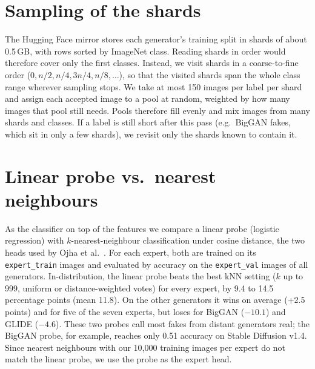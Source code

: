 \documentclass[10pt,a4paper]{article}
\begin{document}
\section{Sampling of the shards}\label{app:sampling}
The Hugging Face mirror stores each generator's training split in shards of about 0.5\,GB, with rows sorted by ImageNet class. Reading shards in order would therefore cover only the first classes. Instead, we visit shards in a coarse-to-fine order ($0, n/2, n/4, 3n/4, n/8, \ldots$), so that the visited shards span the whole class range wherever sampling stops. We take at most 150 images per label per shard and assign each accepted image to a pool at random, weighted by how many images that pool still needs. Pools therefore fill evenly and mix images from many shards and classes. If a label is still short after this pass (e.g.\ BigGAN fakes, which sit in only a few shards), we revisit only the shards known to contain it.

\section{Linear probe vs.\ nearest neighbours}\label{app:knn}
As the classifier on top of the features we compare a linear probe (logistic regression) with $k$-nearest-neighbour classification under cosine distance, the two heads used by Ojha et al.~\cite{ojha2023universal}. For each expert, both are trained on its \texttt{expert\_train} images and evaluated by accuracy on the \texttt{expert\_val} images of all generators. In-distribution, the linear probe beats the best kNN setting ($k$ up to 999, uniform or distance-weighted votes) for every expert, by 9.4 to 14.5 percentage points (mean 11.8). On the other generators it wins on average (+2.5 points) and for five of the seven experts, but loses for BigGAN ($-10.1$) and GLIDE ($-4.6$). These two probes call most fakes from distant generators real; the BigGAN probe, for example, reaches only 0.51 accuracy on Stable Diffusion v1.4. Since nearest neighbours with our 10,000 training images per expert do not match the linear probe, we use the probe as the expert head.
\end{document}
